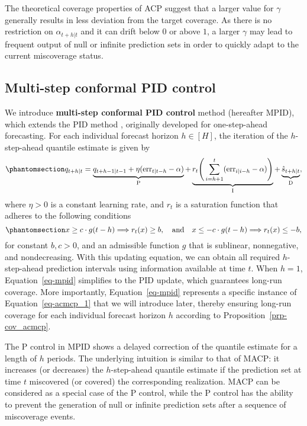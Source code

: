 \documentclass[
  11pt,
  a4paper,
]{article}
\theoremstyle{plain}
\theoremstyle{remark}
\begin{document}
The theoretical coverage properties of ACP suggest that a larger value
for \(\gamma\) generally results in less deviation from the target
coverage. As there is no restriction on \(\alpha_{t+h|t}\) and it can
drift below \(0\) or above \(1\), a larger \(\gamma\) may lead to
frequent output of null or infinite prediction sets in order to quickly
adapt to the current miscoverage status.

\subsection{Multi-step conformal PID
control}\label{multi-step-conformal-pid-control}

We introduce \textbf{multi-step conformal PID control} method (hereafter
MPID), which extends the PID method \autocite{angelopoulos2024},
originally developed for one-step-ahead forecasting. For each individual
forecast horizon \(h\in[H]\), the iteration of the \(h\)-step-ahead
quantile estimate is given by
\begin{equation}\phantomsection\label{eq-mpid}{
q_{t+h|t}=\underbrace{q_{t+h-1|t-1}+\eta (\mathrm{err}_{t|t-h}-\alpha)}_{\mathrm{P}}+\underbrace{r_t\Bigg(\sum_{i=h+1}^t (\mathrm{err}_{i|i-h}-\alpha)\Bigg)}_{\mathrm{I}}+\underbrace{\hat{s}_{t+h|t}}_{\mathrm{D}},
}\end{equation} where \(\eta > 0\) is a constant learning rate, and
\(r_t\) is a saturation function that adheres to the following
conditions\pagebreak[1]\begin{equation}\phantomsection\label{eq-saturation_h}{
x \geq c \cdot g(t-h) \Longrightarrow r_t(x) \geq b, \quad \text {and} \quad x \leq-c \cdot g(t-h) \Longrightarrow r_t(x) \leq -b,
}\end{equation} for constant \(b, c > 0\), and an admissible function
\(g\) that is sublinear, nonnegative, and nondecreasing. With this
updating equation, we can obtain all required \(h\)-step-ahead
prediction intervals using information available at time \(t\). When
\(h=1\), Equation~\ref{eq-mpid} simplifies to the PID update, which
guarantees long-run coverage. More importantly, Equation~\ref{eq-mpid}
represents a specific instance of Equation~\ref{eq-acmcp_1} that we will
introduce later, thereby ensuring long-run coverage for each individual
forecast horizon \(h\) according to Proposition~\ref{prp-cov_acmcp}.

The P control in MPID shows a delayed correction of the quantile
estimate for a length of \(h\) periods. The underlying intuition is
similar to that of MACP: it increases (or decreases) the
\(h\)-step-ahead quantile estimate if the prediction set at time \(t\)
miscovered (or covered) the corresponding realization. MACP can be
considered as a special case of the P control, while the P control has
the ability to prevent the generation of null or infinite prediction
sets after a sequence of miscoverage events.
\end{document}
